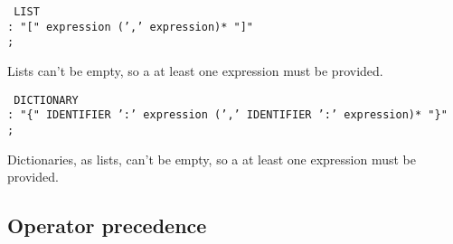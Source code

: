 \texttt{
    LIST\\
        \tab: "[" expression (',' expression)* "]"\\
        \tab;
}

Lists can't be empty, so a at least one expression must be provided.

\texttt{
    DICTIONARY\\
        \tab: "\{" IDENTIFIER ':' expression (',' IDENTIFIER ':' expression)* "\}"\\
        \tab;
}

Dictionaries, as lists, can't be empty, so a at least one expression must be provided.

\subsection{Operator precedence}
